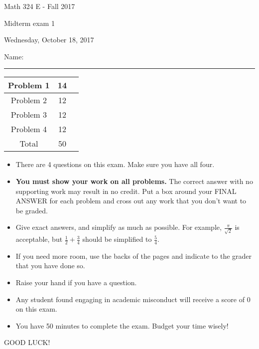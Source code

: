 \documentclass[12 pt]{report}
\begin{document}
\noindent \vfill \noindent \large

\centerline{Math 324 E - Fall 2017}

\centerline{Midterm exam 1}

\centerline{Wednesday, October 18, 2017}

\normalsize

\vfill
\medskip
Name: \rule{10cm}{1pt}

\bigskip

\vfill
\begin{center}
{\large
\begin{tabular}{||c|c|r||}
\hline Problem 1 & 14 & \hspace{10mm} \hfill \\
\hline Problem 2 & 12  & \hspace{10mm} \hfill \\
\hline Problem 3 & 12 & \hspace{10mm} \hfill \\
\hline Problem 4 & 12  & \hspace{10mm} \hfill \\
\hline Total & 50 & \hspace{10mm} \hfill \\
\hline
\end{tabular}
}
\end{center}
\vfill
\begin{itemize}
\item There are 4 questions on this exam. Make sure you have all four.
\item \textbf{You must show your work on all problems.}  The correct answer
with no supporting work may result in no credit. Put a box
around your FINAL ANSWER for each problem and cross out any work
that you don't want to be graded.
\item Give exact answers, and simplify as much as possible. 
For example, $\frac{\pi}{\sqrt{2}}$ is acceptable, but $\frac{1}{2} + \frac{3}{4}$
should be simplified to $\frac{5}{4}$.  

\item If you need more room, use the backs
of the pages and indicate to the grader that you have done so.
\item Raise your hand if you have a question.
\item Any student found engaging in academic misconduct will receive
a score of 0 on this exam.
\item You have 50 minutes to complete the exam.  Budget your time wisely! \\
\end{itemize}
\vfill
\begin{center}GOOD LUCK!\end{center}
\end{document}
